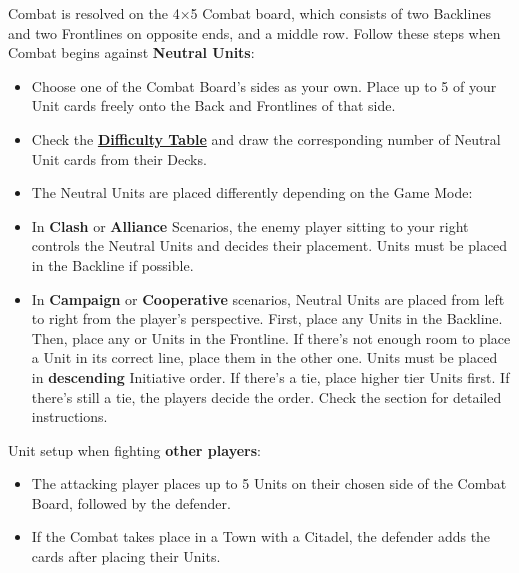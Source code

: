 \begin{multicols*}{2}
Combat is resolved on the 4×5 Combat board, which consists of two Backlines and two Frontlines on opposite ends, and a middle row.
Follow these steps when Combat begins against \textbf{Neutral Units}:

\begin{itemize}
  \item Choose one of the Combat Board's sides as your own. Place up to 5 of your Unit cards freely onto the Back and Frontlines of that side.
  \item Check the \hyperlink{Difficulty Table}{\textbf{Difficulty Table}} \iftoggle{printable}{(on the back cover)}{} and draw the corresponding number of Neutral Unit cards from their Decks.
  \item The Neutral Units are placed differently depending on the Game Mode:
  \item In \textbf{Clash} or \textbf{Alliance} Scenarios, the enemy player sitting to your right controls the Neutral Units and decides their placement.  Units must be placed in the Backline if possible.
  \item {}In \textbf{Campaign} or \textbf{Cooperative} scenarios, Neutral Units are placed from left to right from the player's perspective.
First, place any  Units in the Backline.
Then, place any  or  Units in the Frontline.
If there's not enough room to place a Unit in its correct line, place them in the other one.
Units must be placed in \textbf{descending} Initiative order.
If there's a tie, place higher tier Units first.
If there's still a tie, the players decide the order.
Check the  section for detailed instructions.
\end{itemize}
Unit setup when fighting \textbf{other players}:
\begin{itemize}
  \item The attacking player places up to 5 Units on their chosen side of the Combat Board, followed by the defender.
  \item If the Combat takes place in a Town with a Citadel, the defender adds the  cards after placing their Units.
\end{itemize}


\end{multicols*}
